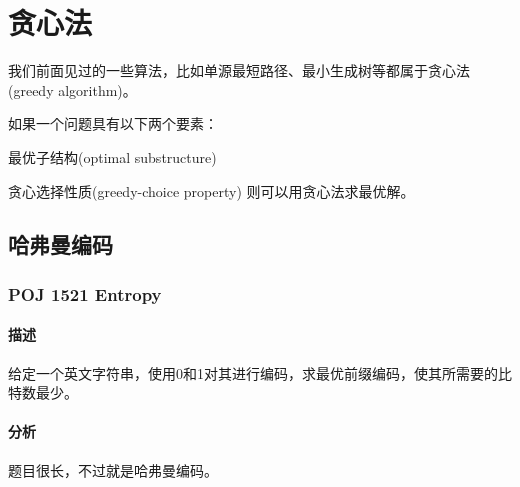 \chapter{贪心法}
我们前面见过的一些算法，比如单源最短路径、最小生成树等都属于贪心法(greedy algorithm)。

如果一个问题具有以下两个要素：
\begindot
\item 最优子结构(optimal substructure)
\item 贪心选择性质(greedy-choice property)
\myenddot
则可以用贪心法求最优解。

\section{哈弗曼编码} %

\subsection{POJ 1521 Entropy}

\subsubsection{描述}
给定一个英文字符串，使用0和1对其进行编码，求最优前缀编码，使其所需要的比特数最少。

\subsubsection{分析}
题目很长，不过就是哈弗曼编码。

